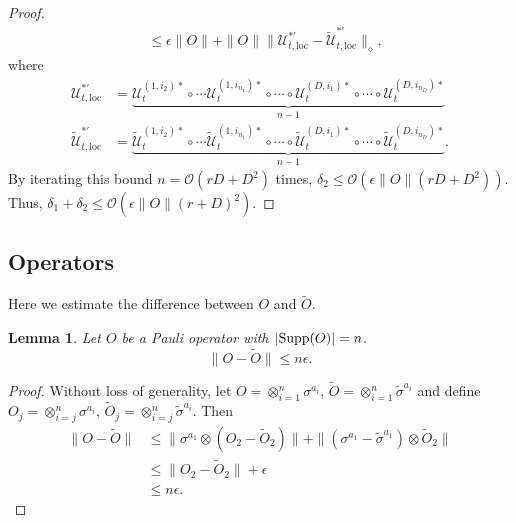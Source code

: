 \documentclass[prx,aps,amsmath,amssymb,floatfix,superscriptaddress,11pt,tightenlines,longbibliography,onecolumn,notitlepage]{revtex4-1}
\newcommand{\Supp}[1]{\textnormal{Supp}(#1)}
\newtheorem{lem}{Lemma}
\begin{document}
\begin{proof}
\begin{equation}
\begin{aligned}
        &\leq \epsilon \|O \|  + \|O \| \|\mathcal{U}_{t,\text{loc}}^{*'} - \tilde{\mathcal{U}}_{t,\text{loc}}^{*'} \|_{\diamond},
        \end{aligned}
    \end{equation}
    where
    \begin{equation}
      \begin{aligned}
    \mathcal{U}_{t,\text{loc}}^{*'} &= \underbrace{\mathcal{U}_{t}^{(1,i_2)*}\circ \cdots \mathcal{U}_t^{(1,i_{n_1})*} \circ \cdots \circ \mathcal{U}_t^{(D,i_1)*} \circ \cdots \circ \mathcal{U}_t^{(D,i_{n_D})*}}_{n-1}\\
    \tilde{\mathcal{U}}_{t,\text{loc}}^{*'} &= \underbrace{\tilde{\mathcal{U}}_{t}^{(1,i_2)*}\circ \cdots \tilde{\mathcal{U}}_t^{(1,i_{n_1})*} \circ \cdots \circ \tilde{\mathcal{U}}_t^{(D,i_1)*} \circ \cdots \circ \tilde{\mathcal{U}}_t^{(D,i_{n_D})*}}_{n-1}.
      \end{aligned}
      \end{equation}
      By iterating this bound $n=\mathcal{O}(rD+D^2)$ times, $\delta_2\leq \mathcal{O}(\epsilon\|O \|(rD+D^2))$. Thus, $\delta_1+\delta_2 \leq \mathcal{O}(\epsilon \|O \|(r+D)^2)$.
\end{proof}
\subsection{Operators\label{section:observables}}
Here we estimate the difference between $O$ and $\tilde{O}$.
\begin{lem}
  \label{lemma:observables}
  Let $O$ be a Pauli operator with $|\Supp{O}|=n$.
  \begin{equation}
    \| O - \tilde{O} \| \leq n\epsilon.
  \end{equation}
\end{lem}
\begin{proof}
   Without loss of generality, let $O= \otimes_{i=1}^{n} \sigma^{a_i}$, $\tilde{O}=\otimes_{i=1}^{n} \tilde{\sigma}^{a_i}$ and define $O_j= \otimes_{i=j}^n \sigma^{a_i}$, $\tilde{O}_j = \otimes_{i=j}^n \tilde{\sigma}^{a_i}$. Then
\begin{equation}
  \begin{aligned}
    \| O - \tilde{O} \| &\leq \|\sigma^{a_1}\otimes (O_2 - \tilde{O}_2)\| + \|(\sigma^{a_1} - \tilde{\sigma}^{a_1})\otimes \tilde{O}_2 \| \\
    &\leq \|O_2- \tilde{O}_2\| + \epsilon \\
    &\leq n\epsilon.
  \end{aligned}
\end{equation}
  \end{proof}
\end{document}
